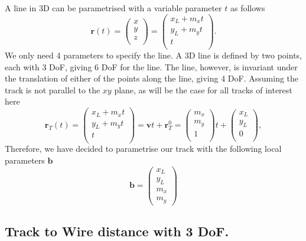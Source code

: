 \documentclass[a4paper,11pt]{article}
\begin{document}
A line in 3D can be parametrised with a variable parameter $t$ as follows
\begin{equation}
\textbf{r}(t) = \begin{pmatrix}x\\y\\z\\\end{pmatrix} = \begin{pmatrix}x_L + m_x  t\\y_L + m_y t\\t\\\end{pmatrix}.
\end{equation}
We only need 4 parameters to specify the line. A 3D line is defined by two points, each with 3 DoF, giving 6 DoF for the line. The line, however, is invariant under the translation of either of the points along the line, giving 4 DoF. Assuming the track is not parallel to the $xy$ plane, as will be the case for all tracks of interest here 
\begin{equation}
\textbf{r}_T(t) =  \begin{pmatrix}x_L + m_x  t\\y_L + m_y  t\\  t\\\end{pmatrix} =  \textbf{v}t+\textbf{r}_T^0=\begin{pmatrix}m_x\\ m_y \\  1\\\end{pmatrix}t + \begin{pmatrix}x_L \\y_L  \\  0\\\end{pmatrix},
\label{eq:track}
\end{equation}
Therefore, we have decided to parametrise our track with the following local parameters $\textbf{b}$
\begin{equation}
\textbf{b} = \begin{pmatrix}x_L \\y_L \\m_x \\ m_y\end{pmatrix}
\end{equation}

\subsection{Track to Wire distance with 3 DoF.}
\end{document}
